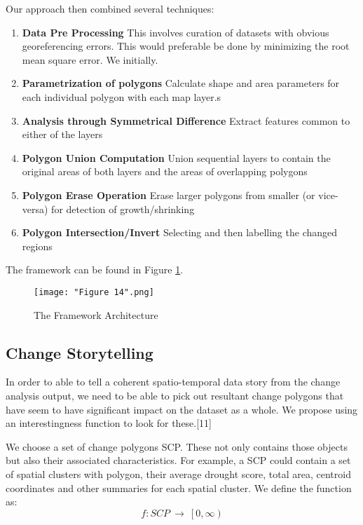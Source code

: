\documentclass[conference]{IEEEtran}
\begin{document}
Our approach then combined several techniques:
\begin{enumerate}
	\item \textbf{Data Pre Processing} This involves curation of datasets with obvious georeferencing errors. This would preferable be done by minimizing the root mean square error. We initially.
	\item \textbf{Parametrization of polygons} Calculate shape and area parameters for each individual polygon with each map layer.s
	\item \textbf{Analysis through Symmetrical Difference} Extract features common to either of the layers
	\item \textbf{Polygon Union Computation} Union sequential layers to contain the original areas of both layers and the areas of overlapping polygons
	\item \textbf{Polygon Erase Operation} Erase larger polygons from smaller (or vice-versa) for detection of growth/shrinking
	\item \textbf{Polygon Intersection/Invert} Selecting and then labelling the changed regions
\end{enumerate}

The framework can be found in Figure \ref{Figure 1}.

\begin{figure}[ht]
\centerline{\texttt{[image: "Figure 14".png]}}
\caption{The Framework Architecture}
\label{Figure 1}
\end{figure}
%



\subsection{Change Storytelling}

In order to able to tell a coherent spatio-temporal data story from the change analysis output, we need to be able to pick out resultant change polygons that have seem to have significant impact on the dataset as a whole. We propose using an interestingness function to look for these.[11]

We choose a set of change polygons SCP. These not only contains those objects but also their associated characteristics. For example, a SCP could contain a set of spatial clusters with polygon, their average drought score, total area, centroid coordinates and other summaries for each spatial cluster. We define the function as:
\[f:SCP\ \rightarrow\ \left[0\right.,\left.\infty\right)\]
\end{document}
